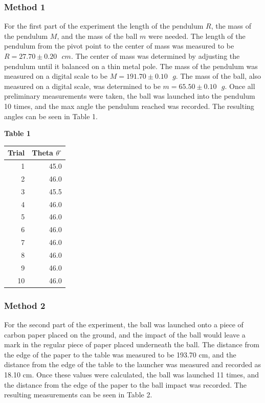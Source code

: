 \documentclass[11pt]{article}
\begin{document}
\hypertarget{method-1-1}{%
\subsubsection*{\centering Method 1}\label{method-1-1}}

For the first part of the experiment the length of the pendulum \(R\),
the mass of the pendulum \(M\), and the mass of the ball \(m\) were
needed. The length of the pendulum from the pivot point to the center of
mass was measured to be \(R=27.70 \pm 0.20\text{ }cm\). The center of
mass was determined by adjusting the pendulum until it balanced on a
thin metal pole. The mass of the pendulum was measured on a digital
scale to be \(M = 191.70 \pm 0.10\text{ }g\). The mass of the ball, also
measured on a digital scale, was determined to be
\(m = 65.50 \pm 0.10\text{ }g\). Once all preliminary measurements were
taken, the ball was launched into the pendulum 10 times, and the max
angle the pendulum reached was recorded. The resulting angles can be
seen in Table 1.

\begin{center}
\textbf{Table 1}

\begin{tabular}{rr}
\toprule
 Trial &  Theta $\theta^{\circ}$ \\
\midrule
     1 &                    45.0 \\
     2 &                    46.0 \\
     3 &                    45.5 \\
     4 &                    46.0 \\
     5 &                    46.0 \\
     6 &                    46.0 \\
     7 &                    46.0 \\
     8 &                    46.0 \\
     9 &                    46.0 \\
    10 &                    46.0 \\
\bottomrule
\end{tabular}
\end{center}

\hypertarget{method-2-1}{%
\subsubsection*{\centering Method 2}\label{method-2-1}}

For the second part of the experiment, the ball was launched onto a
piece of carbon paper placed on the ground, and the impact of the ball
would leave a mark in the regular piece of paper placed underneath the
ball. The distance from the edge of the paper to the table was measured
to be 193.70 cm, and the distance from the edge of the table to the
launcher was measured and recorded as 18.10 cm. Once these values were
calculated, the ball was launched 11 times, and the distance from the
edge of the paper to the ball impact was recorded. The resulting
measurements can be seen in Table 2.
\end{document}
